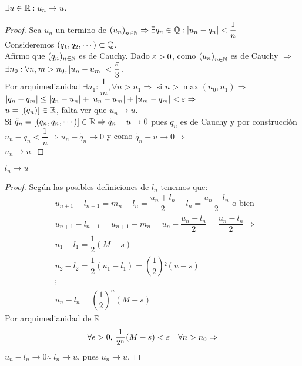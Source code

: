 \begin{lemma}
	\(\exists u \in \mathbb{R} : u_n \to u\).
	\begin{proof}
		Sea \(u_n\) un termino de \({(u_n)}_{n \in \mathbb{N}} \Rightarrow \exists q_n \in \mathbb{Q} : |u_n - q_n| < \dfrac{1}{n} \) \\
		Consideremos \((q_1, q_2, \cdots) \subset \mathbb{Q} \). \\
		Afirmo que \((q_n)_{n \in \mathbb{N}} \) es de Cauchy. Dado \(\varepsilon > 0\), como \({(u_n)}_{n \in \mathbb{N}} \) es de Cauchy \(\Rightarrow \) \\
		\(\exists n_0 : \forall n, m > n_0, |u_n - u_m| < \dfrac{\varepsilon}{3} \). \\
		Por arquimedianidad \(\exists n_1 : \dfrac{1}{m}, \forall n > n_1 \Rightarrow \) si \(n > \max(n_0, n_1) \Rightarrow \) \\
		\(|q_n - q_m| \leq |q_n - u_n| + |u_n - u_m| + |u_m - q_m| < \varepsilon \Rightarrow \) \\
		\(u = [(q_n)] \in \mathbb{R} \), falta ver que \(u_n \to u\). \\
		Si \(\tilde{q}_n = [(q_n, q_n, \cdots)] \in \mathbb{R} \Rightarrow \tilde{q}_n - u \to 0\) pues \(q_n\) es de Cauchy y por construcción \(u_n - q_n < \dfrac{1}{n} \Rightarrow u_n - \tilde{q}_n \to 0\) y como \(\tilde{q}_n - u \to 0 \Rightarrow \) \\
		\(u_n \to u\).
	\end{proof}
\end{lemma}

\begin{lemma}
	\(l_n \to u\)
	\begin{proof}
		Según las posibles definiciones de \(l_n\) tenemos que: \begin{align*}
			 & u_{n+1} - l_{n+1} = m_n - l_n = \dfrac{u_n+l_n}{2} - l_n = \dfrac{u_n-l_n}{2} \text{ o bien }     \\
			 & u_{n+1} - l_{n+1} = u_{n+1} - m_n = u_n - \dfrac{u_n - l_n}{2} = \dfrac{u_n - l_n}{2} \Rightarrow \\
			 & u_1 - l_1 = \dfrac{1}{2} (M-s)                                                                    \\
			 & u_2 - l_2 = \dfrac{1}{2} (u_1 - l_1) = (\dfrac{1}{2})² (u - s)                                    \\
			 & \vdots                                                                                            \\
			 & u_n - l_n = (\dfrac{1}{2})^n (M - s)
		\end{align*}
		Por arquimedianidad de \(\mathbb{R} \) \begin{align*}
			\forall \epsilon > 0\text{, } \dfrac{1}{2^n} (M - s) < \varepsilon \quad \forall n > n_0 \Rightarrow
		\end{align*}
		\(u_n - l_n \to 0 \therefore \) \(l_n \to u\), pues \(u_n \to u\).
	\end{proof}
\end{lemma}

